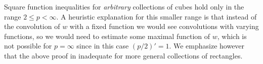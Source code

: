\begin{remark}
Square function inequalities for \emph{arbitrary} collections of cubes \cite{MR850681,MR2293255} hold only in the range $2\leq p<\infty$.
A heuristic explanation for this smaller range is that instead of the convolution of $w$ with a fixed function we would see convolutions with varying functions, so we would need to estimate some maximal function of $w$, which is not possible for $p=\infty$ since in this case $(p/2)'=1$.
We emphasize however that the above proof in inadequate for more general collections of rectangles.
\end{remark}

\begin{center}
\end{center}

